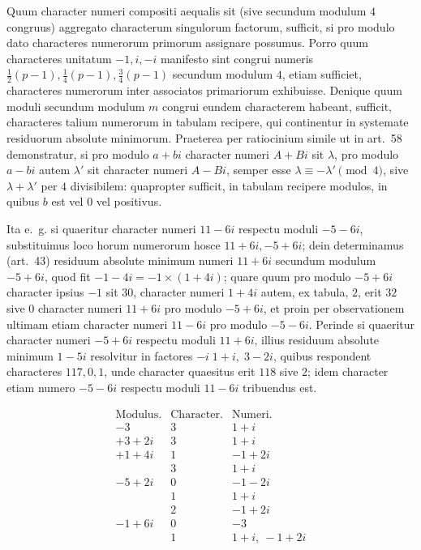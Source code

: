 %
Quum character numeri compositi aequalis sit (sive secundum modulum $4$ congruus) aggregato characterum singulorum factorum, sufficit, si pro modulo dato characteres numerorum primorum assignare possumus. Porro quum characteres unitatum $-1,i,-i$ manifesto sint congrui numeris $\frac12(p-1),\frac14(p-1),\frac34(p-1)$ secundum modulum $4$, etiam sufficiet, characteres numerorum inter associatos primariorum exhibuisse. Denique quum moduli secundum modulum $m$ congrui eundem characterem habeant, sufficit, characteres talium numerorum in tabulam recipere, qui continentur in systemate residuorum absolute minimorum. Praeterea per ratiocinium simile ut in art.~58 demonstratur, si pro modulo $a+bi$ character numeri $A+Bi$ sit $\lambda$, pro modulo $a-bi$ autem $\lambda'$ sit character numeri $A-Bi$, semper esse $\lambda\equiv-\lambda'\pmod4$, sive $\lambda+\lambda'$ per $4$ divisibilem: quapropter sufficit, in tabulam recipere modulos, in quibus $b$ est vel $0$ vel positivus.

Ita e.~g. si quaeritur character numeri $11-6i$ respectu moduli $-5-6i$, substituimus loco horum numerorum hosce $11+6i,-5+6i$; dein determinamus (art.~43) residuum absolute minimum numeri $11+6i$ secundum modulum $-5+6i$, quod fit $-1-4i=-1\times(1+4i)$; quare quum pro modulo $-5+6i$ character ipsius $-1$ sit $30$, character numeri $1+4i$ autem, ex tabula, $2$, erit $32$ sive $0$ character numeri $11+6i$ pro modulo $-5+6i$, et proin per observationem ultimam etiam character numeri $11-6i$ pro modulo $-5-6i$. Perinde si quaeritur character numeri $-5+6i$ respectu moduli $11+6i$, illius residuum absolute minimum $1-5i$ resolvitur in factores $-i\;1+i,\;3-2i$, quibus respondent characteres $117,0,1$, unde character quaesitus erit $118$ sive $2$; idem character etiam numero $-5-6i$ respectu moduli $11-6i$ tribuendus est.

\[
\begin{array}{r|c|l}
\text{Modulus.}&\text{Character.}&\text{Numeri.}\\\hline
-3&3&1+i\\
+3+2i&3&1+i\\
+1+4i&1&-1+2i\\
&3&1+i\\
-5+2i&0&-1-2i\\
&1&1+i\\
&2&-1+2i\\
-1+6i&0&-3\\
&1&1+i,\ -1+2i
\end{array}
\]

